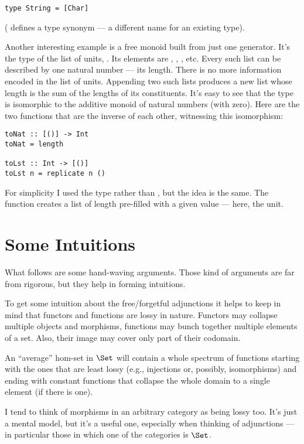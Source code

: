 \begin{Verbatim}
type String = [Char]
\end{Verbatim}
( defines a type synonym --- a different name for an
existing type).

Another interesting example is a free monoid built from just one
generator. It's the type of the list of units, \code{{[}(){]}}. Its
elements are \code{{[}{]}}, \code{{[}(){]}}, \code{{[}(), (){]}},
etc. Every such list can be described by one natural number --- its
length. There is no more information encoded in the list of units.
Appending two such lists produces a new list whose length is the sum of
the lengths of its constituents. It's easy to see that the type
\code{{[}(){]}} is isomorphic to the additive monoid of natural
numbers (with zero). Here are the two functions that are the inverse of
each other, witnessing this isomorphism:

\begin{Verbatim}
toNat :: [()] -> Int
toNat = length

toLst :: Int -> [()]
toLst n = replicate n ()
\end{Verbatim}
For simplicity I used the type  rather than
, but the idea is the same. The function
 creates a list of length  pre-filled with a
given value --- here, the unit.

\section{Some Intuitions}

What follows are some hand-waving arguments. Those kind of arguments are
far from rigorous, but they help in forming intuitions.

To get some intuition about the free/forgetful adjunctions it helps to
keep in mind that functors and functions are lossy in nature. Functors
may collapse multiple objects and morphisms, functions may bunch
together multiple elements of a set. Also, their image may cover only
part of their codomain.

An ``average'' hom-set in $\Set$ will contain a whole spectrum of
functions starting with the ones that are least lossy (e.g., injections
or, possibly, isomorphisms) and ending with constant functions that
collapse the whole domain to a single element (if there is one).

I tend to think of morphisms in an arbitrary category as being lossy
too. It's just a mental model, but it's a useful one, especially when
thinking of adjunctions --- in particular those in which one of the
categories is $\Set$.


